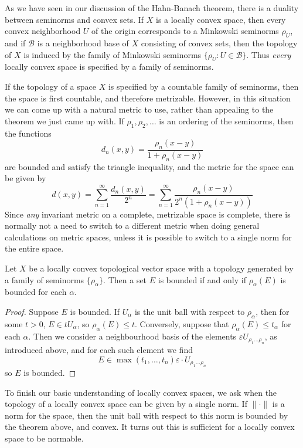 As we have seen in our discussion of the Hahn-Banach theorem, there is a duality between seminorms and convex sets. If $X$ is a locally convex space, then every convex neighborhood $U$ of the origin corresponds to a Minkowski seminorms $\rho_U$, and if $\mathcal{B}$ is a neighborhood base of $X$ consisting of convex sets, then the topology of $X$ is induced by the family of Minkowski seminorms $\{ \rho_U : U \in \mathcal{B} \}$. Thus \emph{every} locally convex space is specified by a family of seminorms.

If the topology of a space $X$ is specified by a countable family of seminorms, then the space is first countable, and therefore metrizable. However, in this situation we can come up with a natural metric to use, rather than appealing to the theorem we just came up with. If $\rho_1, \rho_2, \dots$ is an ordering of the seminorms, then the functions
%
\[ d_n(x,y) = \frac{\rho_n(x - y)}{1 + \rho_n(x-y)} \]
%
are bounded and satisfy the triangle inequality, and the metric for the space can be given by
%
\[ d(x,y) = \sum_{n = 1}^\infty \frac{d_n(x,y)}{2^n} = \sum_{n = 1}^\infty \frac{\rho_n(x-y)}{2^n (1 + \rho_n(x-y))} \]
%
Since {\it any} invariant metric on a complete, metrizable space is complete, there is normally not a need to switch to a different metric when doing general calculations on metric spaces, unless it is possible to switch to a single norm for the entire space.

\begin{theorem}
    Let $X$ be a locally convex topological vector space with a topology generated by a family of seminorms $\{ \rho_\alpha \}$. Then a set $E$ is bounded if and only if $\rho_\alpha(E)$ is bounded for each $\alpha$.
\end{theorem}
\begin{proof}
    Suppose $E$ is bounded. If $U_\alpha$ is the unit ball with respect to $\rho_\alpha$, then for some $t > 0$, $E \in t U_\alpha$, so $\rho_\alpha(E) \leq t$. Conversely, suppose that $\rho_\alpha(E) \leq t_\alpha$ for each $\alpha$. Then we consider a neighbourhood basis of the elements $\varepsilon U_{\rho_1 \dots \rho_n}$, as introduced above, and for each such element we find
    \[ E \in \max(t_1, \dots, t_n) \varepsilon \cdot U_{\rho_1 \dots \rho_n} \]
    so $E$ is bounded.
\end{proof}

To finish our basic understanding of locally convex spaces, we ask when the topology of a locally convex space can be given by a single norm. If $\| \cdot \|$ is a norm for the space, then the unit ball with respect to this norm is bounded by the theorem above, and convex. It turns out this is sufficient for a locally convex space to be normable.

